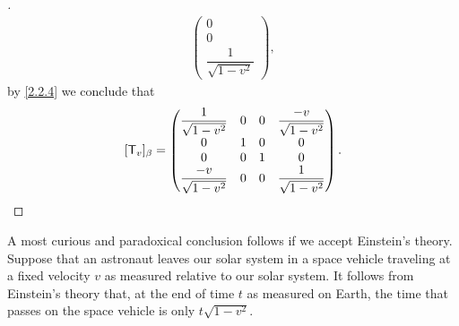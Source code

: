 \begin{proof}[]
\begin{align*}
\begin{pmatrix}
                    0                          \\
                    0                          \\
                    \dfrac{1}{\sqrt{1 - v^2}}
                  \end{pmatrix},
  \end{align*}
  by \cref{2.2.4} we conclude that
  \[
    [\mathsf{T}_v]_{\beta} = \begin{pmatrix}
      \dfrac{1}{\sqrt{1 - v^2}}  & 0 & 0 & \dfrac{-v}{\sqrt{1 - v^2}} \\
      0                          & 1 & 0 & 0                          \\
      0                          & 0 & 1 & 0                          \\
      \dfrac{-v}{\sqrt{1 - v^2}} & 0 & 0 & \dfrac{1}{\sqrt{1 - v^2}}
    \end{pmatrix}.
  \]
\end{proof}

\begin{cor}\label{6.9.4}
  A most curious and paradoxical conclusion follows if we accept Einstein's theory.
  Suppose that an astronaut leaves our solar system in a space vehicle traveling at a fixed velocity \(v\) as measured relative to our solar system.
  It follows from Einstein's theory that, at the end of time \(t\) as measured on Earth, the time that passes on the space vehicle is only \(t \sqrt{1 - v^2}\).
\end{cor}

